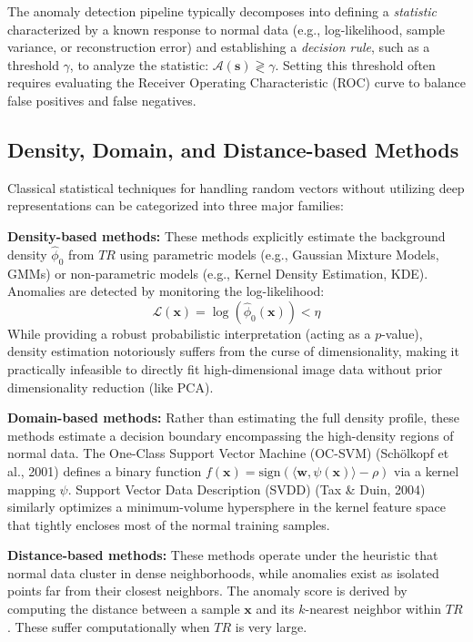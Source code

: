 The anomaly detection pipeline typically decomposes into defining a \textit{statistic} characterized by a known response to normal data (e.g., log-likelihood, sample variance, or reconstruction error) and establishing a \textit{decision rule}, such as a threshold $\gamma$, to analyze the statistic: $\mathcal{A}(\boldsymbol{s}) \gtrless \gamma$. Setting this threshold often requires evaluating the Receiver Operating Characteristic (ROC) curve to balance false positives and false negatives.

\subsection{Density, Domain, and Distance-based Methods}
Classical statistical techniques for handling random vectors without utilizing deep representations can be categorized into three major families:

\textbf{Density-based methods:} These methods explicitly estimate the background density $\hat{\phi}_0$ from $TR$ using parametric models (e.g., Gaussian Mixture Models, GMMs) or non-parametric models (e.g., Kernel Density Estimation, KDE). Anomalies are detected by monitoring the log-likelihood:
\begin{equation}
    \mathcal{L}(\boldsymbol{x}) = \log(\hat{\phi}_0(\boldsymbol{x})) < \eta
\end{equation}
While providing a robust probabilistic interpretation (acting as a $p$-value), density estimation notoriously suffers from the curse of dimensionality, making it practically infeasible to directly fit high-dimensional image data without prior dimensionality reduction (like PCA).

\textbf{Domain-based methods:} Rather than estimating the full density profile, these methods estimate a decision boundary encompassing the high-density regions of normal data. The One-Class Support Vector Machine (OC-SVM) (Schölkopf et al., 2001) defines a binary function $f(\boldsymbol{x}) = \text{sign}(\langle \boldsymbol{w}, \psi(\boldsymbol{x}) \rangle - \rho)$ via a kernel mapping $\psi$. Support Vector Data Description (SVDD) (Tax \& Duin, 2004) similarly optimizes a minimum-volume hypersphere in the kernel feature space that tightly encloses most of the normal training samples.

\textbf{Distance-based methods:} These methods operate under the heuristic that normal data cluster in dense neighborhoods, while anomalies exist as isolated points far from their closest neighbors. The anomaly score is derived by computing the distance between a sample $\boldsymbol{x}$ and its $k$-nearest neighbor within $TR$. These suffer computationally when $TR$ is very large.

